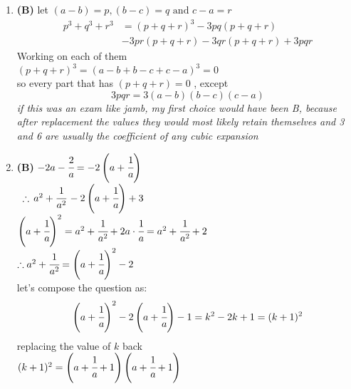 \begin{multicols}{2}
\begin{enumerate}[label={\textbf{\arabic*.}}]
\item \textbf{(B)} let $(a-b) = p, (b-c) = q \text{ and } c-a = r$ \\
\begin{align*}
p^3 + q^3 + r^3 & = (p + q + r)^3 - 3pq(p + q + r) \\
& - 3pr(p+q+r) - 3qr(p + q + r) + 3pqr
\end{align*}
Working on each of them \\
$(p + q + r)^3 = (a - b + b-c + c-a)^3 = 0$ \\
so every part that has $(p + q + r) = 0 $ , except \\
$$3pqr = 3(a-b)(b-c)(c-a)$$
\textit{if this was an exam like jamb, my first choice would have been B, because after replacement the values they would most likely retain themselves and 3 and 6 are usually the coefficient of any cubic expansion }
\item \textbf{(B)} $-2a - \cfrac{2}{a} = -2\left(a+ \cfrac{1}{a}\right)$ \\
$ \hspace{5pt}\therefore \, a^2 + \cfrac{1}{a^2}  \,-2\left(a+ \cfrac{1}{a}\right) + 3$ \\
$\left(a + \cfrac{1}{a}\right)^2 = a^2 + \cfrac{1}{a^2}+ 2a\cdot\cfrac{1}{a} = a^2 + \cfrac{1}{a^2} + 2$ \\
$\therefore a^2 + \cfrac{1}{a^2} = \left(a + \cfrac{1}{a} \right)^2 - 2$ \\
let's compose the question as: 
$$\left(a + \cfrac{1}{a}\right)^2 -2\left(a + \cfrac{1}{a}\right) - 1 = k^2 -2k +1 = (k+1)^2$$
replacing the value of $k$ back \\
$(k+1)^2 = \left(a+ \cfrac{1}{a} + 1\right)\left(a + \cfrac{1}{a} + 1\right)$


\end{enumerate}
\end{multicols}
